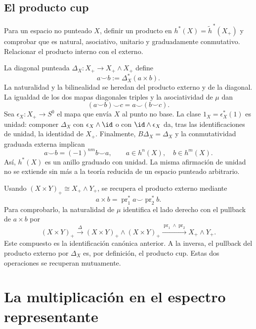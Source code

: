 \subsection{El producto cup}
\begin{ejer}\label{ejer:c24-cup}
Para un espacio no punteado $X$, definir un producto en $h^*(X)=\widetilde h^{\,*}(X_+)$ y comprobar que es natural, asociativo, unitario y graduadamente conmutativo. Relacionar el producto interno con el externo.
\end{ejer}
\begin{sol}
La diagonal punteada $\Delta_X\colon X_+\to X_+\wedge X_+$ define
\[
a\smile b:=\Delta_X^*(a\times b).
\]
La naturalidad y la bilinealidad se heredan del producto externo y de la diagonal. La igualdad de los dos mapas diagonales triples y la asociatividad de $\mu$ dan
\[
(a\smile b)\smile c=a\smile(b\smile c).
\]
Sea $\epsilon_X\colon X_+\to S^0$ el mapa que envía $X$ al punto no base. La clase $1_X=\epsilon_X^*(1)$ es unidad: componer $\Delta_X$ con $\epsilon_X\wedge\id$ o con $\id\wedge\epsilon_X$ da, tras las identificaciones de unidad, la identidad de $X_+$. Finalmente, $B\Delta_X=\Delta_X$ y la conmutatividad graduada externa implican
\[
a\smile b=(-1)^{nm}b\smile a,
\qquad a\in h^n(X),\quad b\in h^m(X).
\]
Así, $h^*(X)$ es un anillo graduado con unidad. La misma afirmación de unidad no se extiende sin más a la teoría reducida de un espacio punteado arbitrario.

Usando $(X\times Y)_+\cong X_+\wedge Y_+$, se recupera el producto externo mediante
\[
a\times b=\operatorname{pr}_1^*a\smile\operatorname{pr}_2^*b.
\]
Para comprobarlo, la naturalidad de $\mu$ identifica el lado derecho con el pullback de $a\times b$ por
\[
(X\times Y)_+\xrightarrow{\Delta}(X\times Y)_+\wedge(X\times Y)_+
\xrightarrow{\operatorname{pr}_1\wedge\operatorname{pr}_2}X_+\wedge Y_+.
\]
Este compuesto es la identificación canónica anterior. A la inversa, el pullback del producto externo por $\Delta_X$ es, por definición, el producto cup. Estas dos operaciones se recuperan mutuamente.
\end{sol}

\section{La multiplicación en el espectro representante}

